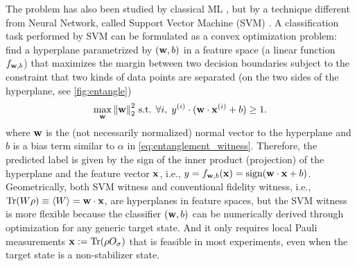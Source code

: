 \documentclass[
aps,
pra,
twocolumn,
floatfix,
]{revtex4-2}
\theoremstyle{plain}
\theoremstyle{definition}
\newcommand{\ew}{W}
\newcommand{\pob}{O}
\newcommand{\dm}{\rho}
\begin{document}
The  problem has also been studied by classical ML \cite{zhuMachineLearningDerivedEntanglement2021}  \cite{vintskevichClassificationFourqubitEntangled2022}, 
but by a technique different from Neural Network, called Support Vector Machine (SVM)  \cite{cortesSupportvectorNetworks1995}.
A classification task performed by SVM can be formulated as a convex optimization problem:
find a hyperplane parametrized by $(\vb{w},b)$  in a feature space (a linear function $f_{\vb{w},b}$) that maximizes the margin between two decision boundaries subject to the constraint that two kinds of data points are separated (on the two sides of the hyperplane, see \cref{fig:entangle})
\begin{equation}
	\max_{\vb{w}}
	\norm{\vb{w}}_2^2
	\text{ s.t. }
	\forall i,\; y^{(i)}\cdot (\vb{w}\cdot\vb{x}^{(i)}+b)\ge 1.
	\label{eq:svm_opt}
\end{equation}
where $\vb{w}$ is the (not necessarily normalized) normal vector to the hyperplane and $b$ is a bias term similar to $\alpha$ in \cref{eq:entanglement_witness}.
Therefore, the predicted label is given by the sign of the inner product (projection) of the hyperplane and the feature vector $\vb{x}$, i.e., $y=f_{\vb{w},b}(\vb{x})=\text{sign}(\vb{w}\cdot\vb{x}+b)$.
Geometrically, both SVM witness and conventional fidelity witness, i.e., $\Tr(W\dm)\equiv\expval{\ew}=\vbw \cdot \vbx$, are hyperplanes in feature spaces,
but the SVM witness is more flexible because the classifier $(\vb{w},b)$ can be numerically derived through optimization for any generic target state.
And it only requires local Pauli measurements $\vbx:=\Tr(\dm\pob_{\sigma})$ that is feasible in most experiments, even when the target state is a non-stabilizer state.
\end{document}
